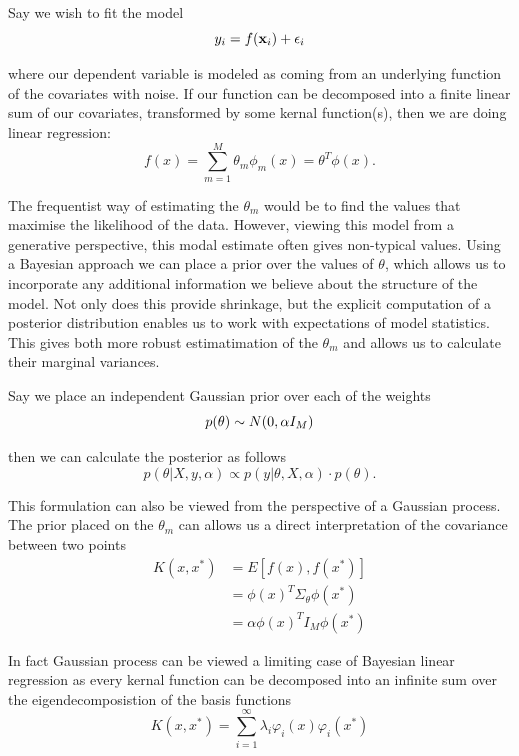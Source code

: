 \documentclass[a4paper]{article}
\begin{document}
Say we wish to fit the model
\begin{equation}
y_i = f({\bf x}_i) + \epsilon_i
\end{equation}

where our dependent variable is modeled as coming from an underlying function of the covariates with noise. If our function can be decomposed into a finite linear sum of our covariates, transformed by some kernal function(s), then we are doing linear regression:
\begin{equation}
f(x) = \sum_{m=1}^M \theta_m \phi_m(x) = \theta^T \phi(x).
\end{equation}

The frequentist way of estimating the $\theta_m$ would be to find the values that maximise the likelihood of the data. However, viewing this model from a generative perspective, this modal estimate often gives non-typical values. Using a Bayesian approach we can place a prior over the values of $\theta$, which allows us to incorporate any additional information we believe about the structure of the model. Not only does this provide shrinkage, but the explicit computation of a posterior distribution enables us to work with expectations of model statistics. This gives both more robust estimatimation of the $\theta_m$ and allows us to calculate their marginal variances. 

Say we place an independent Gaussian prior over each of the weights
\begin{equation}
p({\bf\theta}) \sim N(0, \alpha I_M)
\end{equation}

then we can calculate the posterior as follows
\begin{equation}
p(\theta|X, y, \alpha) \propto p(y | \theta, X, \alpha) \cdot p(\theta).
\end{equation}      

This formulation can also be viewed from the perspective of a Gaussian process. The prior placed on the $\theta_m$ can allows us a direct interpretation of the covariance between two points
\begin{align}
K(x, x^*) &= E[f(x), f(x^*)] \\
          &= \phi{(x)}^T \Sigma_\theta \phi(x^*) \\
          &= \alpha \phi{(x)}^T I_M \phi(x^*)
\end{align}

In fact Gaussian process can be viewed a limiting case of Bayesian linear regression as every kernal function can be decomposed into an infinite sum over the eigendecomposistion of the basis functions
\begin{equation}
K(x, x^*) = \sum_{i=1}^\infty \lambda_i \varphi_i(x) \varphi_i(x^*)
\end{equation}
\end{document}
